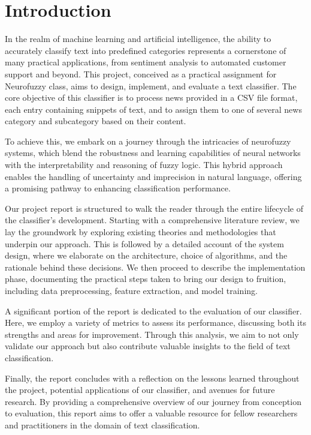 \section{Introduction}

In the realm of machine learning and artificial intelligence, the ability to accurately classify text into predefined categories represents a cornerstone of many practical applications, from sentiment analysis to automated customer support and beyond. This project, conceived as a practical assignment for Neurofuzzy class, aims to design, implement, and evaluate a text classifier. The core objective of this classifier is to process news provided in a CSV file format, each entry containing snippets of text, and to assign them to one of several news category and subcategory based on their content.

To achieve this, we embark on a journey through the intricacies of neurofuzzy systems, which blend the robustness and learning capabilities of neural networks with the interpretability and reasoning of fuzzy logic. This hybrid approach enables the handling of uncertainty and imprecision in natural language, offering a promising pathway to enhancing classification performance.

Our project report is structured to walk the reader through the entire lifecycle of the classifier's development. Starting with a comprehensive literature review, we lay the groundwork by exploring existing theories and methodologies that underpin our approach. This is followed by a detailed account of the system design, where we elaborate on the architecture, choice of algorithms, and the rationale behind these decisions. We then proceed to describe the implementation phase, documenting the practical steps taken to bring our design to fruition, including data preprocessing, feature extraction, and model training.

A significant portion of the report is dedicated to the evaluation of our classifier. Here, we employ a variety of metrics to assess its performance, discussing both its strengths and areas for improvement. Through this analysis, we aim to not only validate our approach but also contribute valuable insights to the field of text classification.

Finally, the report concludes with a reflection on the lessons learned throughout the project, potential applications of our classifier, and avenues for future research. By providing a comprehensive overview of our journey from conception to evaluation, this report aims to offer a valuable resource for fellow researchers and practitioners in the domain of text classification.